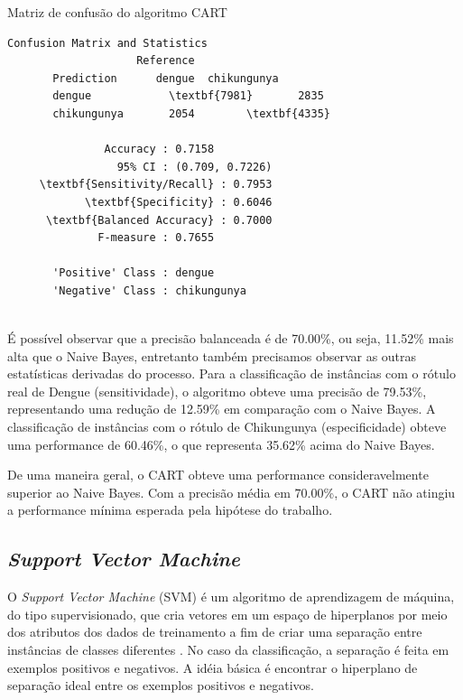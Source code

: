 \begin{quadro}
\caption{\label{quadro:cart1}Matriz de confusão do algoritmo CART}
\begingroup
    \fontsize{10pt}{9pt}\selectfont
    \begin{Verbatim}[commandchars=\\\{\}]
      Confusion Matrix and Statistics
                    Reference
       Prediction      dengue  chikungunya
       dengue            \textbf{7981}       2835
       chikungunya       2054        \textbf{4335}
                                         
               Accuracy : 0.7158         
                 95% CI : (0.709, 0.7226)
     \textbf{Sensitivity/Recall} : 0.7953         
            \textbf{Specificity} : 0.6046         
      \textbf{Balanced Accuracy} : 0.7000
              F-measure : 0.7655        
         
       'Positive' Class : dengue 
       'Negative' Class : chikungunya
  
    \end{Verbatim}  
\endgroup
{}
\end{quadro}

É possível observar que a precisão balanceada é de 70.00\%, ou seja, 11.52\% mais alta que o Naive Bayes, entretanto também precisamos observar as outras estatísticas derivadas do processo. Para a classificação de instâncias com o rótulo real de Dengue (sensitividade), o algoritmo obteve uma precisão de 79.53\%, representando uma redução de 12.59\% em comparação com o Naive Bayes. A classificação de instâncias com o rótulo de Chikungunya (especificidade) obteve uma performance de 60.46\%, o que representa 35.62\% acima do Naive Bayes.

De uma maneira geral, o CART obteve uma performance consideravelmente superior ao Naive Bayes. Com a precisão média em 70.00\%, o CART não atingiu a performance mínima esperada pela hipótese do trabalho.

\subsection{\textit{Support Vector Machine}}

O \textit{Support Vector Machine} (SVM) é um algoritmo de aprendizagem de máquina, do tipo supervisionado, que cria vetores em um espaço de hiperplanos por meio dos atributos dos dados de treinamento a fim de criar uma separação entre instâncias de classes diferentes \cite{rebentrost2014quantum}. No caso da classificação, a separação é feita em exemplos positivos e negativos. A idéia básica é encontrar o hiperplano de separação ideal entre os exemplos positivos e negativos.

